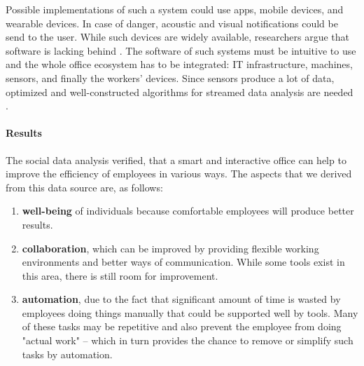 Possible implementations of such a system could use apps, mobile devices, and wearable devices. In case of 
danger, acoustic and visual notifications could be send to the user. While such devices are widely 
available, researchers argue that software is lacking behind \cite{sda-wired}. The software of such systems 
must be intuitive to use and the whole office ecosystem has to be integrated: IT infrastructure, machines, 
sensors, and finally the workers' devices. Since sensors produce a lot of data, 
optimized and well-constructed algorithms for streamed data analysis are needed \cite{sda-wired}.

\paragraph{Results}
The social data analysis verified, that a smart and interactive office can help to improve the 
efficiency of employees in various ways. The aspects that we derived from this data source are, as follows:

\begin{enumerate}
	\item \textbf{well-being} of individuals because comfortable employees will produce better results.
	\item \textbf{collaboration}, which can be improved by providing flexible working environments and better ways of communication. While some tools exist in this area, there is still room for improvement. 
	\item \textbf{automation}, due to the fact that significant amount of time is wasted by employees doing things manually that could be supported well by tools. Many of these tasks may be repetitive and also prevent the employee from doing "actual work" -- which in turn provides the chance to remove or simplify such tasks by automation.
\end{enumerate}
